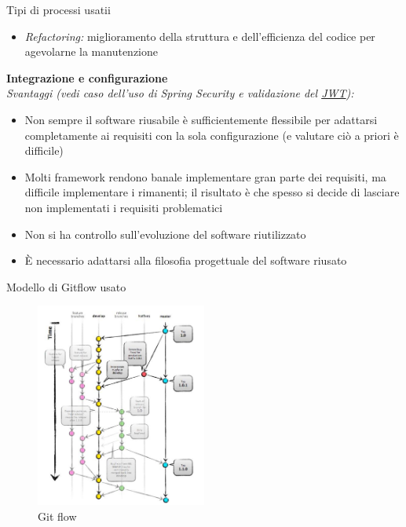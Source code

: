 \documentclass[10pt]{beamer}
\begin{document}
\begin{frame}[allowframebreaks]{Tipi di processi usatii}
\begin{itemize}
		\item
		\emph{Refactoring:} miglioramento della struttura e dell’efficienza del codice per agevolarne la manutenzione
	\end{itemize}
\framebreak

	\textbf{Integrazione e configurazione} \\
		\emph{Svantaggi (vedi caso dell’uso di Spring Security e validazione del \href{https://jwt.io/}{JWT}):}
	\begin{itemize}
		
		\item
		Non sempre il software riusabile è sufficientemente flessibile per adattarsi completamente ai requisiti con la sola configurazione (e valutare ciò a priori è difficile)
		
		\item
		Molti framework rendono banale implementare gran parte dei requisiti, ma difficile implementare i rimanenti; il risultato è che spesso si decide di lasciare non implementati i requisiti problematici

		\item
		Non si ha controllo sull’evoluzione del software riutilizzato

		\item
		È necessario adattarsi alla filosofia progettuale del software riusato

	\end{itemize}

\end{frame}

\begin{frame}{Modello di Gitflow usato}

	\begin{figure}[h]
		\centering
		\includegraphics[width=0.5\textwidth]
		{../images/git-flow}
		
		\caption{Git flow}
	\end{figure}

\end{frame}
\end{document}
